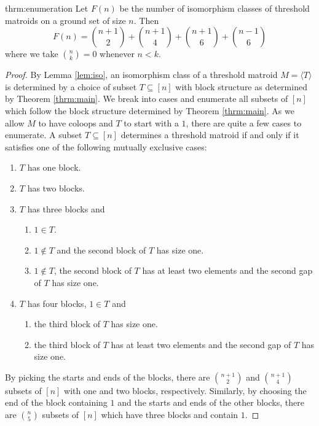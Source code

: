 \documentclass{amsart}
\theoremstyle{definition}
\theoremstyle{plain}
\begin{document}
\begin{repintrotheorem}{thrm:enumeration}
Let $F(n)$ be the number of isomorphism classes of threshold matroids on a ground set of size $n$. Then
\[F(n) = \binom{n+1}{2} + \binom{n+1}{4}+ \binom{n+1}{6} + \binom{n-1}{6}\]
where we take $\binom{n}{k}=0$ whenever $n<k$.
\end{repintrotheorem}
\begin{proof}
  By Lemma \ref{lem:iso}, an isomorphism class of a threshold matroid $M=\langle T \rangle $ is determined by a choice of subset $T\subseteq [n]$ with block structure as determined by Theorem \ref{thrm:main}. We break into cases and enumerate all subsets of $[n]$ which follow the block structure determined by Theorem \ref{thrm:main}. As we allow $M$ to have coloops and $T$ to start with a $1$, there are quite a few cases to enumerate. A subset $T\subseteq [n]$ determines a threshold matroid if and only if it satisfies one of the following mutually exclusive cases:
  \begin{enumerate}
  \item $T$ has one block.
  \item $T$ has two blocks.
  \item $T$ has three blocks and
 \begin{enumerate}
 \item $1\in T$.
 \item \label{case:3b} $1\not\in T$ and the second block of $T$ has size one.
 \item \label{case:3c}$1\not\in T$, the second block of $T$ has at least two elements and the second gap of $T$ has size one.
 \end{enumerate} 
 \item $T$ has four blocks, $1\in T$ and
  \begin{enumerate}
  \item \label{case:4a}the third block of $T$ has size one.
  \item \label{case:4b}the third block of $T$ has at least two elements and the second gap of $T$ has size one.
  \end{enumerate}
 \end{enumerate}

 By picking the starts and ends of the blocks, there are $\binom{n+1}{2}$ and $\binom{n+1}{4}$ subsets of $[n]$ with one and two blocks, respectively. Similarly, by choosing the end of the block containing $1$ and the starts and ends of the other blocks, there are $\binom{n}{5}$ subsets of $[n]$ which have three blocks and contain $1$.


\end{proof}
\end{document}
